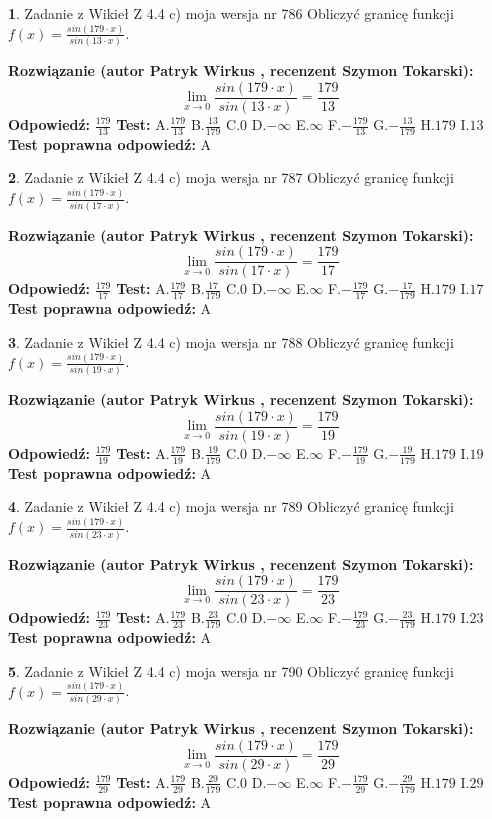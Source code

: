 \documentclass[12pt, a4paper]{article}
\theoremstyle{definition} %
\newtheorem{zad}{}
\newcommand{\zadStart}[1]{\begin{zad}#1\newline}
\newcommand{\zadStop}{\end{zad}}
\newcommand{\rozwStart}[2]{\noindent \textbf{Rozwiązanie (autor #1 , recenzent #2): }\newline}
\newcommand{\rozwStop}{\newline}
\newcommand{\odpStart}{\noindent \textbf{Odpowiedź:}\newline}
\newcommand{\odpStop}{\newline}
\newcommand{\testStart}{\noindent \textbf{Test:}\newline}
\newcommand{\testStop}{\newline}
\newcommand{\kluczStart}{\noindent \textbf{Test poprawna odpowiedź:}\newline}
\newcommand{\kluczStop}{\newline}
\begin{document}
\zadStart{Zadanie z Wikieł Z 4.4 c) moja wersja nr 786}
Obliczyć granicę funkcji $f(x)=\frac{sin(179\cdot x)}{sin(13\cdot x)}$.
\zadStop
\rozwStart{Patryk Wirkus}{Szymon Tokarski}
$$\lim\limits_{x\to 0}\frac{sin(179\cdot x)}{sin(13\cdot x)}=
\frac{179}{13}$$
\rozwStop
\odpStart
$\frac{179}{13}$
\odpStop
\testStart
A.$\frac{179}{13}$
B.$\frac{13}{179}$
C.$0$
D.$-\infty$
E.$\infty$
F.$-\frac{179}{13}$
G.$-\frac{13}{179}$
H.$179$
I.$13$
\testStop
\kluczStart
A
\kluczStop



\zadStart{Zadanie z Wikieł Z 4.4 c) moja wersja nr 787}
Obliczyć granicę funkcji $f(x)=\frac{sin(179\cdot x)}{sin(17\cdot x)}$.
\zadStop
\rozwStart{Patryk Wirkus}{Szymon Tokarski}
$$\lim\limits_{x\to 0}\frac{sin(179\cdot x)}{sin(17\cdot x)}=
\frac{179}{17}$$
\rozwStop
\odpStart
$\frac{179}{17}$
\odpStop
\testStart
A.$\frac{179}{17}$
B.$\frac{17}{179}$
C.$0$
D.$-\infty$
E.$\infty$
F.$-\frac{179}{17}$
G.$-\frac{17}{179}$
H.$179$
I.$17$
\testStop
\kluczStart
A
\kluczStop



\zadStart{Zadanie z Wikieł Z 4.4 c) moja wersja nr 788}
Obliczyć granicę funkcji $f(x)=\frac{sin(179\cdot x)}{sin(19\cdot x)}$.
\zadStop
\rozwStart{Patryk Wirkus}{Szymon Tokarski}
$$\lim\limits_{x\to 0}\frac{sin(179\cdot x)}{sin(19\cdot x)}=
\frac{179}{19}$$
\rozwStop
\odpStart
$\frac{179}{19}$
\odpStop
\testStart
A.$\frac{179}{19}$
B.$\frac{19}{179}$
C.$0$
D.$-\infty$
E.$\infty$
F.$-\frac{179}{19}$
G.$-\frac{19}{179}$
H.$179$
I.$19$
\testStop
\kluczStart
A
\kluczStop



\zadStart{Zadanie z Wikieł Z 4.4 c) moja wersja nr 789}
Obliczyć granicę funkcji $f(x)=\frac{sin(179\cdot x)}{sin(23\cdot x)}$.
\zadStop
\rozwStart{Patryk Wirkus}{Szymon Tokarski}
$$\lim\limits_{x\to 0}\frac{sin(179\cdot x)}{sin(23\cdot x)}=
\frac{179}{23}$$
\rozwStop
\odpStart
$\frac{179}{23}$
\odpStop
\testStart
A.$\frac{179}{23}$
B.$\frac{23}{179}$
C.$0$
D.$-\infty$
E.$\infty$
F.$-\frac{179}{23}$
G.$-\frac{23}{179}$
H.$179$
I.$23$
\testStop
\kluczStart
A
\kluczStop



\zadStart{Zadanie z Wikieł Z 4.4 c) moja wersja nr 790}
Obliczyć granicę funkcji $f(x)=\frac{sin(179\cdot x)}{sin(29\cdot x)}$.
\zadStop
\rozwStart{Patryk Wirkus}{Szymon Tokarski}
$$\lim\limits_{x\to 0}\frac{sin(179\cdot x)}{sin(29\cdot x)}=
\frac{179}{29}$$
\rozwStop
\odpStart
$\frac{179}{29}$
\odpStop
\testStart
A.$\frac{179}{29}$
B.$\frac{29}{179}$
C.$0$
D.$-\infty$
E.$\infty$
F.$-\frac{179}{29}$
G.$-\frac{29}{179}$
H.$179$
I.$29$
\testStop
\kluczStart
A
\kluczStop
\end{document}

